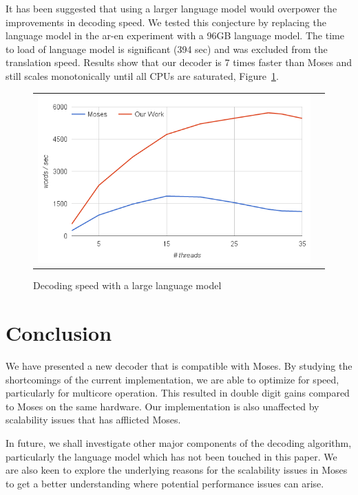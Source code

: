 \documentclass[11pt]{article}
\begin{document}
It has been suggested that using a larger language model would overpower the improvements in decoding speed. We tested this conjecture by replacing the language model in the ar-en experiment with a 96GB language model. The time to load of language model is significant (394 sec) and was excluded from the translation speed. Results show that our decoder is 7 times faster than Moses and still scales monotonically until all CPUs are saturated, Figure~\ref{fig:large-lm}.
\begin{figure}[h]
\centering
\begin{tabular}{cc}
{\includegraphics[scale=0.4]{large-lm.png}} 
\end{tabular}
\caption{Decoding speed with a large language model}
\label{fig:large-lm}
\end{figure} 

\section{Conclusion}

We have presented a new decoder that is compatible with Moses. By studying the shortcomings of the current implementation, we are able to optimize for speed, particularly for multicore operation. This resulted in double digit gains compared to Moses on the same hardware. Our implementation is also unaffected by scalability issues that has afflicted Moses. %

In future, we shall investigate other major components of the decoding algorithm, particularly the language model which has not been touched in this paper. We are also keen to explore the underlying reasons for the scalability issues in Moses to get a better understanding where potential performance issues can arise. 

% 



\end{document}
